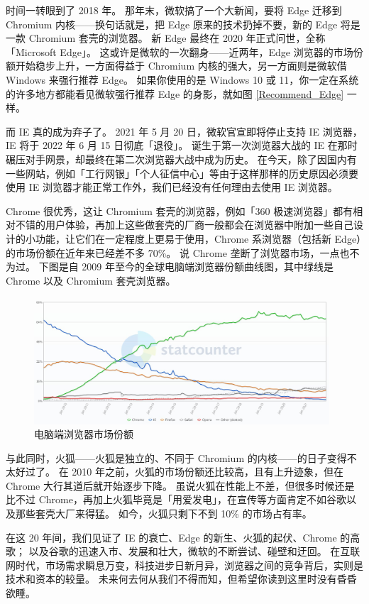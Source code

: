 时间一转眼到了 2018 年。
那年末，微软搞了一个大新闻，要将 Edge 迁移到 Chromium 内核——换句话就是，把 Edge 原来的技术扔掉不要，新的 Edge 将是一款 Chromium 套壳的浏览器。
新 Edge 最终在 2020 年正式问世，全称「Microsoft Edge」。
这或许是微软的一次翻身——近两年，Edge 浏览器的市场份额开始稳步上升，一方面得益于 Chromium 内核的强大，另一方面则是微软借 Windows 来强行推荐 Edge。
如果你使用的是 Windows 10 或 11，你一定在系统的许多地方都能看见微软强行推荐 Edge 的身影，就如图 \ref{Recommend_Edge} 一样。

而 IE 真的成为弃子了。
2021 年 5 月 20 日，微软官宣即将停止支持 IE 浏览器，IE 将于 2022 年 6 月 15 日彻底「退役」。
诞生于第一次浏览器大战的 IE 在那时碾压对手网景，却最终在第二次浏览器大战中成为历史。
在今天，除了因国内有一些网站，例如「工行网银」「个人征信中心」等由于这样那样的历史原因必须要使用 IE 浏览器才能正常工作外，我们已经没有任何理由去使用 IE 浏览器。

Chrome 很优秀，这让 Chromium 套壳的浏览器，例如「360 极速浏览器」都有相对不错的用户体验，再加上这些做套壳的厂商一般都会在浏览器中附加一些自己设计的小功能，让它们在一定程度上更易于使用，Chrome 系浏览器（包括新 Edge）的市场份额在近年来已经差不多 70\%。
说 Chrome 垄断了浏览器市场，一点也不为过。
下图是自 2009 年至今的全球电脑端浏览器份额曲线图，其中绿线是 Chrome 以及 Chromium 套壳浏览器。

\begin{figure}[htb!]
  \centering
  \includegraphics[width=11cm]{assets/Desktop_Browser_Market.jpg}
  \caption{电脑端浏览器市场份额}
  \label{Desktop_Browser_Market}
\end{figure}

与此同时，火狐——火狐是独立的、不同于 Chromium 的内核——的日子变得不太好过了。
在 2010 年之前，火狐的市场份额还比较高，且有上升迹象，但在 Chrome 大行其道后就开始逐步下降。
虽说火狐在性能上不差，但很多时候还是比不过 Chrome，再加上火狐毕竟是「用爱发电」，在宣传等方面肯定不如谷歌以及那些套壳大厂来得猛。
如今，火狐只剩下不到 10\% 的市场占有率。

在这 20 年间，我们见证了 IE 的衰亡、Edge 的新生、火狐的起伏、Chrome 的高歌；
以及谷歌的迅速入市、发展和壮大，微软的不断尝试、碰壁和迂回。
在互联网时代，市场需求瞬息万变，科技进步日新月异，浏览器之间的竞争背后，实则是技术和资本的较量。
未来何去何从我们不得而知，但希望你读到这里时没有昏昏欲睡。

